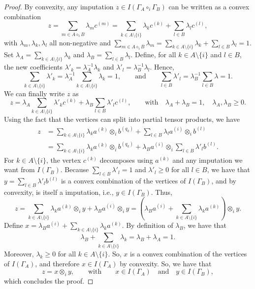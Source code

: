 \documentclass[10pt,a4paper]{amsart}
\begin{document}
\begin{proof}
    \medskip

    By convexity, any imputation \(z \in I(\Gamma_A \circ_i \Gamma_B)\) can be written as a convex combination
    \[
    z = \sum_{m \in A \diamond_i B} \lambda_m c^{(m)} = \sum_{k \in A \setminus \{i\}} \lambda_k c^{(k)} + \sum_{l \in B} \lambda_l c^{(l)}, 
    \]
    with \(\lambda_m, \lambda_k, \lambda_l\) all non-negative and \(\sum_{m \in A \diamond_i B} \lambda_m = \sum_{k \in A \setminus \{i\}} \lambda_k + \sum_{l \in B} \lambda_l = 1\). Set \(\lambda_A = \sum_{k \in A \setminus \{i\}} \lambda_k\) and \(\lambda_B = \sum_{l \in B} \lambda_l\). Define, for all \(k \in A \setminus \{i\}\) and \(l \in B\), the new coefficients \(\lambda'_k = \lambda_A^{-1} \lambda_k\) and \(\lambda'_l = \lambda_B^{-1} \lambda_l\). Hence, 
    \[
    \sum_{k \in A \setminus \{i\}} \lambda'_k = \lambda_A^{-1} \sum_{k \in A \setminus \{i\}} \lambda_k = 1, \qquad \text{and} \qquad \sum_{l \in B} \lambda'_l = \lambda_B^{-1} \sum_{l \in B} \lambda = 1. 
    \]
    We can finally write \(z\) as 
    \[
    z = \lambda_A \sum_{k \in A \setminus \{i\}} \lambda'_k c^{(k)} + \lambda_B \sum_{l \in B} \lambda'_l c^{(l)}, \qquad \text{with} \quad \lambda_A + \lambda_B = 1, \quad \lambda_A, \lambda_B \geq 0. 
    \]
    Using the fact that the vertices can split into partial tensor products, we have 
    \[ \begin{aligned} 
    z & = \sum_{k \in A \setminus \{i\}} \lambda_k a^{(k)} \otimes_i b^{(q_k)} + \sum_{l \in B} \lambda_l a^{(i)} \otimes_i b^{(l)} \\
    & = \sum_{k \in A \setminus \{i\}} \lambda_k a^{(k)} \otimes_i b^{(q_k)} + \lambda_B a^{(i)} \otimes_i \sum_{l \in B} \lambda'_l b^{(l)}. 
    \end{aligned} \]
    For \(k \in A \setminus \{i\}\), the vertex \(c^{(k)}\) decomposes using \(a^{(k)}\) and any imputation we want from \(I(\Gamma_B)\). Because \(\sum_{l \in B}  \lambda'_l = 1\) and \(\lambda'_l \geq 0\) for all \(l \in B\), we have that \(y = \sum_{l \in B} \lambda'_l b^{(l)}\) is a convex combination of the vertices of \(I(\Gamma_B)\), and by convexity, is itself a imputation, i.e., \(y \in I(\Gamma_B)\). Thus, 
    \[
    z = \sum_{k \in A \setminus \{i\}} \lambda_k a^{(k)} \otimes_i y + \lambda_B a^{(i)} \otimes_i y = \left( \lambda_B a^{(i)} +  \sum_{k \in A \setminus \{i\}} \lambda_k a^{(k)} \right) \otimes_i y. 
    \]
    Define \(x = \lambda_B a^{(i)} + \sum_{k \in A \setminus \{i\}} \lambda_k a^{(k)}\). By definition of \(\lambda_B\), we have that 
    \[
    \lambda_B + \sum_{k \in A \setminus \{i\}} \lambda_k = \lambda_B + \lambda_A = 1. 
    \]
    Moreover, \(\lambda_k \geq 0\) for all \(k \in A \setminus \{i\}\). So, \(x\) is a convex combination of the vertices of \(I(\Gamma_A)\), and therefore \(x \in I(\Gamma_A)\) by convexity. So, we have that 
    \[
    z = x \otimes_i y, \qquad \text{with} \qquad x \in I(\Gamma_A) \quad \text{and} \quad y \in I(\Gamma_B), 
    \]
    which concludes the proof. 
\end{proof}
\end{document}
